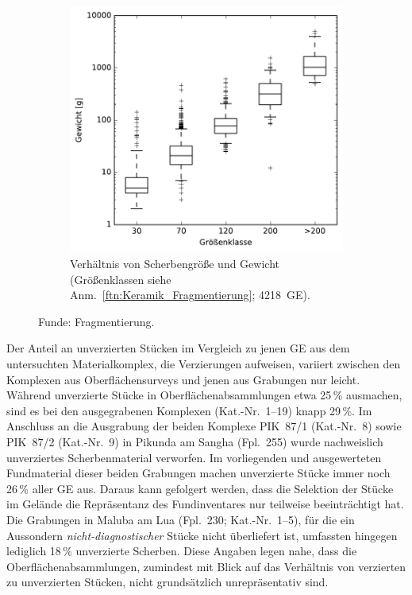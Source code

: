 \begin{multicols}{2}
\begin{figure}[!tb]
\begin{subfigure}{\columnwidth}
\includegraphics[height=.9\textwidth]{fig/2-2_Keramik_Gr-Gew_BoxPlt_2.pdf}
\caption{Verhältnis von Scherbengröße und Gewicht (Größenklassen siehe Anm.~\ref{ftn:Keramik_Fragmentierung}; 4218~GE).}
\label{fig:Keramik_FragmGrGew_B}
\end{subfigure}
\caption{Funde: Fragmentierung.}
\label{fig:Keramik_Typen-Fragm}
\end{figure}

Der Anteil an unverzierten Stücken im Vergleich zu jenen GE aus dem untersuchten Materialkomplex, die Verzierungen aufweisen, variiert zwischen den Komplexen aus Oberflächensurveys und jenen aus Grabungen nur leicht. Während unverzierte Stücke in Oberflächenabsammlungen etwa 25\,\% ausmachen, sind es bei den ausgegrabenen Komplexen (Kat.-Nr.~1--19) knapp 29\,\%. Im Anschluss an die Ausgrabung der beiden Komplexe PIK~87/1 (Kat.-Nr.~8) sowie PIK~87/2 (Kat.-Nr.~9) in Pikunda am \mbox{Sangha} (Fpl.~255) wurde nachweislich unverziertes Scherbenmaterial verworfen. Im vorliegenden und ausgewerteten Fundmaterial dieser beiden Grabungen machen unverzierte Stücke immer noch 26\,\% aller GE aus. Daraus kann gefolgert werden, dass die Selektion der Stücke im Gelände die Repräsentanz des Fundinventares nur teilweise beeinträchtigt hat. Die Grabungen in Maluba am Lua (Fpl.~230; Kat.-Nr.~1--5), für die ein Aussondern \textit{nicht-diagnostischer} Stücke nicht überliefert ist, umfassten hingegen lediglich 18\,\% unverzierte Scherben. Diese Angaben legen nahe, dass die Oberflächenabsammlungen, zumindest mit Blick auf das Verhältnis von verzierten zu unverzierten Stücken, nicht grundsätzlich unrepräsentativ sind.



\end{multicols}
